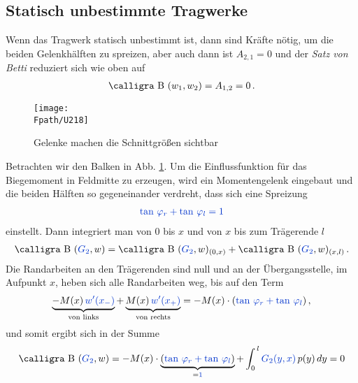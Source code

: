 {\textcolor{sectionTitleBlue}{\section{Statisch unbestimmte Tragwerke}}}
Wenn das Tragwerk statisch unbestimmt ist, dann sind Kr\"{a}fte n\"{o}tig, um die beiden Gelenkh\"{a}lften zu spreizen, aber auch dann ist $A_{2,1} = 0$ und der {\em Satz von Betti\/} reduziert sich wie oben auf
\begin{align}
\text{\normalfont\calligra B\,\,}(w_1,w_2) = A_{1,2} = 0\,.
\end{align}
\begin{figure}[tbp]
\centering
\if {} \sidecaption \fi
\texttt{[image: \\Fpath/U218]}
\caption{Gelenke machen die Schnittgr\"{o}{\ss}en sichtbar} \label{U218}
\end{figure}%
Betrachten wir den Balken in Abb. \ref{U218}. Um die Einflussfunktion f\"{u}r das Biegemoment in Feldmitte zu erzeugen, wird ein Momentengelenk eingebaut und die beiden H\"{a}lften so gegeneinander verdreht, dass sich eine Spreizung
\begin{align}
\textcolor{chapterTitleBlue}{\tan\,\Np_r + \tan\,\Np_l = 1}
\end{align}
einstellt. Dann integriert man von $0$ bis $x$ und von $x$ bis zum Tr\"{a}gerende $l$
\begin{align}
\text{\normalfont\calligra B\,\,}(\textcolor{chapterTitleBlue}{G_2},w) = \text{\normalfont\calligra B\,\,}(\textcolor{chapterTitleBlue}{G_2},w)_{(0,x)} + \text{\normalfont\calligra B\,\,}(\textcolor{chapterTitleBlue}{G_2},w)_{(x,l)}\,.
\end{align}
Die Randarbeiten an den Tr\"{a}gerenden sind null und an der \"{U}bergangsstelle, im Aufpunkt $x$, heben sich alle Randarbeiten weg, bis auf den Term
\begin{align}
\underbrace{-M(x)\,\textcolor{chapterTitleBlue}{w'(x_{-})}}_{\text{von links}} + \underbrace{M(x)\,\textcolor{chapterTitleBlue}{w'(x_+)}}_{\text{von rechts}} = - M(x) \cdot (\textcolor{chapterTitleBlue}{\tan\,\Np_r +\tan\,\Np_l})\,,
\end{align}
und somit ergibt sich in der Summe
\begin{align}
\text{\normalfont\calligra B\,\,}(\textcolor{chapterTitleBlue}{G_2},w) = -M(x) \cdot \underbrace{(\textcolor{chapterTitleBlue}{\tan\,\Np_r + \tan\,\Np_l})}_{= \textcolor{chapterTitleBlue}{ 1}} + \int_0^{\,l} \textcolor{chapterTitleBlue}{G_2(y,x)}\,p(y)\,dy = 0
\end{align}
